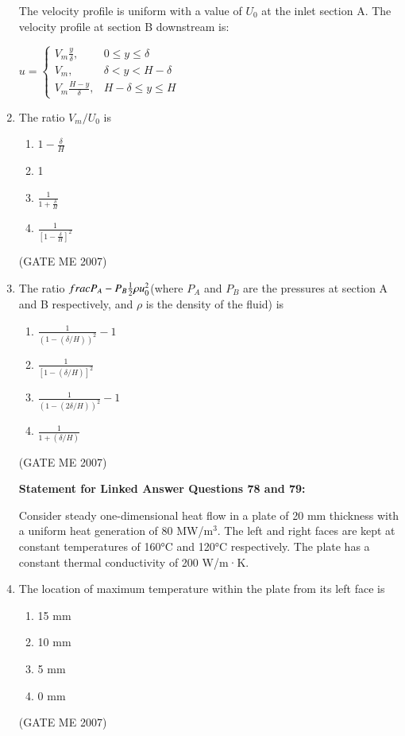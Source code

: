 \documentclass[journal]{IEEEtran}
\begin{document}
\begin{enumerate}
The velocity profile is uniform with a value of \( U_0 \) at the inlet section A.  
The velocity profile at section B downstream is:

\(u =
\begin{cases}
V_m \frac{y}{\delta}, & 0 \leq y \leq \delta \\
V_m, & \delta < y < H - \delta \\
V_m \frac{H - y}{\delta}, & H - \delta \leq y \leq H
\end{cases}
\)

\item The ratio \( V_m / U_0 \) is
\begin{multicols}{2}
\begin{enumerate}
\item \( 1 - \frac{\delta}{H} \)
\item 1
\item \( \frac{1}{1 + \frac{\delta}{H}} \)
\item \( \frac{1}{[1 - \frac{\delta}{H}]^2} \)
\end{enumerate}
\end{multicols}
\hfill (GATE ME 2007)

\item The ratio \(\\frac{P_A - P_B}{\frac{1}{2} \rho u_0^2}\)(where \( P_A \) and \( P_B \) are the pressures at section A and B respectively, and \( \rho \) is the density of the fluid) is
\begin{multicols}{2}
\begin{enumerate}
\item \( \frac{1}{(1 - (\delta / H))^2} - 1 \)
\item \( \frac{1}{[1 - (\delta / H)]^2} \)
\item \( \frac{1}{(1 - (2\delta / H))^2} - 1 \)
\item \( \frac{1}{1 + (\delta / H)} \)
\end{enumerate}
\end{multicols}
\hfill (GATE ME 2007)

\textbf{Statement for Linked Answer Questions 78 and 79:} 

Consider steady one-dimensional heat flow in a plate of 20 mm thickness with a uniform heat generation of 80 MW/m\(^3\). The left and right faces are kept at constant temperatures of 160°C and 120°C respectively. The plate has a constant thermal conductivity of 200 W/m·K.

\item The location of maximum temperature within the plate from its left face is
\begin{multicols}{4}
\begin{enumerate}
\item 15 mm
\item 10 mm
\item 5 mm
\item 0 mm
\end{enumerate}
\end{multicols}
\hfill (GATE ME 2007)


\end{enumerate}
\end{document}
